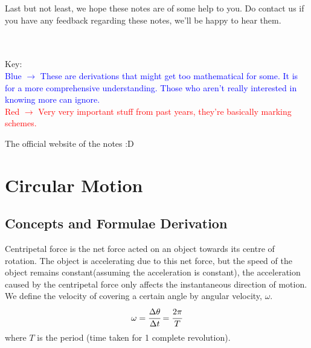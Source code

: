 \documentclass{article}
\begin{document}
Last but not least, we hope these notes are of some help to you. Do contact us if you have any feedback regarding these notes, we'll be happy to hear them. 
\\\\\\

\begin{tcolorbox}
\begin{flushleft}
Key:\\
\textcolor{blue}{Blue $\rightarrow$ These are derivations that might get too mathematical for some. It is for a more comprehensive understanding. Those who aren't really interested in knowing more can ignore.}\\
\textcolor{red}{Red $\rightarrow$ Very very important stuff from past years, they're basically marking schemes.}
\end{flushleft}
\end{tcolorbox}

\begin{flushleft}
The official website of the notes :D\\
\end{flushleft}


\newpage

\maketitle


\tableofcontents

\newpage

\section{Circular Motion}


\subsection{Concepts and Formulae Derivation}


    Centripetal force is the net force acted on an object towards its centre of rotation. The object is accelerating due to this net force, but the speed of the object remains constant(assuming the acceleration is constant), the acceleration caused by the centripetal force only affects the instantaneous direction of motion. We define the velocity of covering a certain angle by angular velocity, $\omega$.
    $$\omega=\cfrac{\Delta \theta}{\Delta t}=\cfrac{2\pi}{T}$$
    where $T$ is the period (time taken for 1 complete revolution).
    
\end{document}

